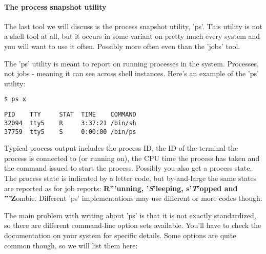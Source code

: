 \paragraph{The process snapshot utility}
The last tool we will discuss is the process snapshot utility, 'ps'. This
utility is not a shell tool at all, but it occurs in some variant on pretty
much every system and you will want to use it often. Possibly more often even
than the 'jobs' tool.

The 'ps' utility is meant to report on running processes in the system.
Processes, not jobs - meaning it can see across shell instances. Here's an
example of the 'ps' utility:

\lstset{basicstyle=\scriptsize, numbers=left, captionpos=b, tabsize=4}
\begin{lstlisting}[caption=process snapshot,language={bash},
xleftmargin=15pt,label=lst:processsnapshot]
$ ps x
\end{lstlisting}

\scriptsize
\begin{verbatim}
PID    TTY     STAT  TIME    COMMAND
32094  tty5    R     3:37:21 /bin/sh
37759  tty5    S     0:00:00 /bin/ps
\end{verbatim}
\normalsize

Typical process output includes the process ID, the ID of the terminal the
process is connected to (or running on), the CPU time the process has taken and
the command issued to start the process. Possibly you also get a process state.
The process state is indicated by a letter code, but by-and-large the same
states are reported as for job reports: \textbf{R'''unning,
'\textit{S}'leeping, s'\textit{T}'opped and '''Z}ombie. Different 'ps'
implementations may use different or more codes though.

The main problem with writing about 'ps' is that it is not exactly
standardized, so there are different command-line option sets available. You'll
have to check the documentation on your system for specific details. Some
options are quite common though, so we will list them here:

